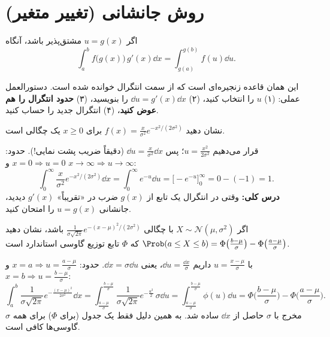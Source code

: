\section{روش جانشانی (تغییر متغیر)}
\begin{theorem}[جانشانی]
اگر $u=g(x)$ مشتق‌پذیر باشد، آنگاه
\[
\int_a^bf\big(g(x)\big)\,g'(x)\dd x=\int_{g(a)}^{g(b)}f(u)\dd u .
\]
\end{theorem}
این همان قاعده زنجیره‌ای است که از سمت انتگرال خوانده شده است. دستورالعمل عملی: (۱) $u$ را انتخاب کنید، (۲) $\dd u=g'(x)\dd x$ را بنویسید، (۳) \textbf{حدود انتگرال را هم عوض کنید}، (۴) انتگرال جدید را حساب کنید.

\begin{example}
نشان دهید $f(x)=\frac{x}{\sigma^2}e^{-x^2/(2\sigma^2)}$ برای $x\ge0$ یک چگالی است.
\begin{solution}
قرار می‌دهیم $u=\frac{x^2}{2\sigma^2}$؛ پس $\dd u=\frac{x}{\sigma^2}\dd x$ (دقیقاً ضریب پشت نمایی!). حدود: $x=0\Rightarrow u=0$ و $x\to\infty\Rightarrow u\to\infty$:
\[
\int_0^\infty\frac{x}{\sigma^2}e^{-x^2/(2\sigma^2)}\dd x=\int_0^\infty e^{-u}\dd u=\big[-e^{-u}\big]_0^\infty=0-(-1)=1 .
\]
\textbf{درس کلی:} وقتی در انتگرال یک تابع از $g(x)$ ضرب در «تقریباً» $g'(x)$ دیدید، جانشانی $u=g(x)$ را امتحان کنید.
\end{solution}
\end{example}

\begin{example}
اگر $X\sim\mathcal N(\mu,\sigma^2)$ با چگالی $\frac{1}{\sigma\sqrt{2\pi}}e^{-(x-\mu)^2/(2\sigma^2)}$ باشد، نشان دهید $\Prob(a\le X\le b)=\Phi\big(\frac{b-\mu}{\sigma}\big)-\Phi\big(\frac{a-\mu}{\sigma}\big)$ که $\Phi$ تابع توزیع گاوسی استاندارد است.
\begin{solution}
با $u=\frac{x-\mu}{\sigma}$ داریم $\dd u=\frac{\dd x}{\sigma}$، یعنی $\dd x=\sigma\dd u$. حدود: $x=a\Rightarrow u=\frac{a-\mu}{\sigma}$ و $x=b\Rightarrow u=\frac{b-\mu}{\sigma}$:
\[
\int_a^b\frac{1}{\sigma\sqrt{2\pi}}e^{-\frac{(x-\mu)^2}{2\sigma^2}}\dd x=\int_{\frac{a-\mu}{\sigma}}^{\frac{b-\mu}{\sigma}}\frac{1}{\sigma\sqrt{2\pi}}e^{-\frac{u^2}{2}}\,\sigma\dd u=\int_{\frac{a-\mu}{\sigma}}^{\frac{b-\mu}{\sigma}}\phi(u)\dd u=\Phi\Big(\frac{b-\mu}{\sigma}\Big)-\Phi\Big(\frac{a-\mu}{\sigma}\Big).
\]
$\sigma$ مخرج با $\sigma$ حاصل از $\dd x$ ساده شد. به همین دلیل فقط یک جدول (برای $\Phi$) برای همه گاوسی‌ها کافی است.
\end{solution}
\end{example}

